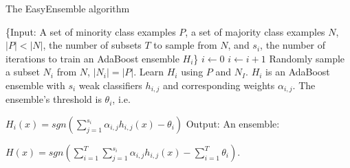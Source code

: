 \documentclass[11pt]{article}
\begin{document}
\begin{algorithm}
\caption{The EasyEnsemble algorithm}
\begin{algorithmic}[1]
	\State \{Input: A set of minority class examples $P$, a set of majority class examples $N$, $|P|<|N|$, the number of subsets $T$ to sample from $N$, and $s_i$, the number of iterations to train an AdaBoost ensemble $H_i$\}
	\State $i \leftarrow 0$
	\Repeat
	\State $i \leftarrow i+1$
	\State Randomly sample a subset $N_i$ from $N$, $|N_i| = |P|$.
	\State Learn $H_i$ using $P$ and $N_I$. $H_i$ is an AdaBoost ensemble with $s_i$ weak classifiers $h_{i,j}$ and corresponding weights $\alpha_{i,j}$. The ensemble's threshold is $\theta_i$, i.e. 
	
	$H_i(x) = sgn(\sum_{j=1}^{s_i}\alpha_{i,j}h_{i,j}(x)-\theta_i)$
	\State Output: An ensemble:
	
	$H(x) = sgn(\sum_{i=1}^T\sum_{j=1}^{s_i}\alpha_{i,j}h_{i,j}(x)-\sum_{i=1}^T\theta_i)$.
\end{algorithmic}
\end{algorithm}
\end{document}
